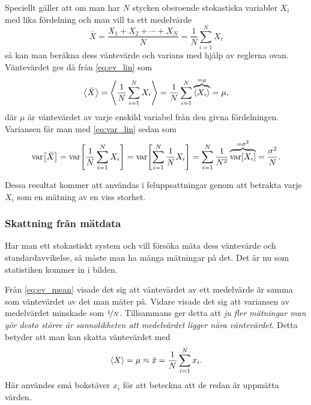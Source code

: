 \documentclass[11pt,a4paper, swedish
]{article}
\newcommand{\VAR}[1]{\ensuremath\text{var}\!\left[#1\right]}
\begin{document}
Speciellt gäller att om man har $N$ stycken oberoende stokastiska variabler
$X_i$ med lika fördelning och man vill ta ett medelvärde 
\begin{equation} 
\bar{X} = \frac{X_1+X_2+\cdots+X_N}{N} = \frac{1}{N}\sum_{i=1}^N X_i
\end{equation}
så kan man beräkna dess väntevärde och varians med hjälp av reglerna
ovan. 
Väntevärdet ges då från \eqref{eq:ev_lin} som
\begin{equation}\label{eq:ev_mean}
\ev{\bar{X}} = \ev{\frac{1}{N} \sum_{i=1}^N X_i} 
= \frac{1}{N} \sum_{i=1}^N \overbrace{\ev{X_i}}^{=\mu} 
= \mu,
\end{equation}
där $\mu$ är väntevärdet av varje enskild variabel från den givna
fördelningen. 
Variansen får man med \eqref{eq:var_lin} sedan som
\begin{equation}\label{eq:var_mean}
\VAR{\bar{X}} = \VAR{\frac{1}{N} \sum_{i=1}^N X_i}
= \VAR{\sum_{i=1}^N \frac{1}{N} X_i}
= \sum_{i=1}^N \frac{1}{N^2}\overbrace{\VAR{X_i}}^{=\sigma^2}
= \frac{\sigma^2}{N}.
\end{equation}

Dessa resultat kommer att användas i feluppsattningar genom att
betrakta varje $X_i$ som en mätning av en viss storhet.

\subsubsection{Skattning från mätdata}
Har man ett stokastiskt system och vill försöka mäta dess väntevärde
och standardavvikelse, så måste man ha många mätningar på det. Det är
nu som statistiken kommer in i bilden.

Från \eqref{eq:ev_mean} visade det sig att väntevärdet av ett
medelvärde är samma som väntevärdet av det man mäter på. Vidare visade
det sig att variansen av medelvärdet minskade som
$\nicefrac{1}{N}$. Tillsammans ger detta att \emph{ju fler mätningar
  man gör desto större är sannolikheten att medelvärdet ligger nära
  väntevärdet}. 
Detta betyder att man kan skatta väntevärdet med
\begin{equation}\label{eq:ev_approx}
\ev{X} = \mu \approx \bar{x} = \frac{1}{N}\sum_{i=1}^N x_i.
\end{equation}
Här användes små bokstäver $x_i$ för att beteckna att de redan är
uppmätta värden.
\end{document}
